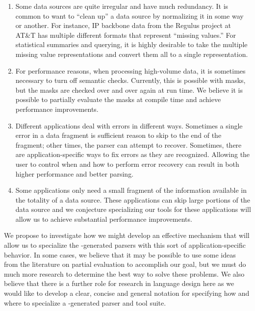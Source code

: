 \documentclass[11pt]{article}
\begin{document}
\begin{enumerate}
\item Some data sources are quite irregular and have much redundancy.
It is common to want to ``clean up'' a data source by
normalizing it in some way or another.  For instance,
IP backbone data from the Regulus project at AT\&T has
multiple different formats that represent  ``missing values.''
For statistical summaries and querying,
it is highly desirable to take the multiple missing value representations
and convert them all to a single representation.
\item For performance reasons, when processing high-volume data,
it is sometimes necessary to turn off semantic checks.  
Currently, this is possible with \pads{} masks, but the masks
are checked over and over again at run time.  We believe it is
possible to partially evaluate the masks at compile time
and achieve performance improvements.
\item Different applications deal with errors in different ways. 
Sometimes a single error in a data fragment is sufficient
reason to skip to the end of the fragment; other times,
the parser can attempt to recover.  Sometimes, there are
application-specific ways to fix errors as they are recognized.
Allowing the user to control when and how to perform
error recovery can result in both
higher performance and better parsing.
\item Some applications only need a small fragment of the information
available in the totality of a data source.  These applications can
skip large portions of the data source and we conjecture specializing
our tools for these applications will allow us to achieve substantial
performance improvements.
\end{enumerate}

We propose to investigate how we might develop an effective mechanism
that will allow us to specialize the \pads-generated parsers 
with this sort of application-specific behavior.  In some cases,
we believe that it may be possible to use some ideas from the 
literature on partial 
evaluation to accomplish our goal, but we must do much more
research to determine the best way to solve these problems.
We also believe that there is a further role for research
in language design here as we would like to develop
a clear, concise and general notation for specifying
how and where to specialize a \pads-generated parser
and tool suite. 

\end{document}
